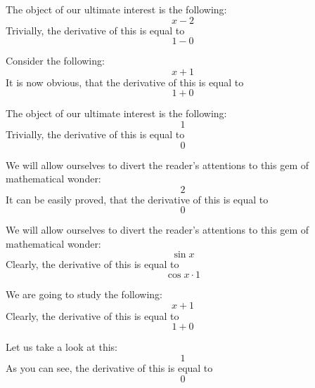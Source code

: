 \documentclass{article}
\begin{document}
The object of our ultimate interest is the following:
\begin{equation}
x - 2 
\end{equation}
Trivially, the derivative of this is equal to
\begin{equation}
1 - 0 
\end{equation}

Consider the following:
\begin{equation}
x + 1 
\end{equation}
It is now obvious, that the derivative of this is equal to
\begin{equation}
1 + 0 
\end{equation}

The object of our ultimate interest is the following:
\begin{equation}
1 
\end{equation}
Trivially, the derivative of this is equal to
\begin{equation}
0 
\end{equation}

We will allow ourselves to divert the reader's attentions to this gem of mathematical wonder:
\begin{equation}
2 
\end{equation}
It can be easily proved, that the derivative of this is equal to
\begin{equation}
0 
\end{equation}

We will allow ourselves to divert the reader's attentions to this gem of mathematical wonder:
\begin{equation}
\sin x 
\end{equation}
Clearly, the derivative of this is equal to
\begin{equation}
\cos x \cdot 1 
\end{equation}

We are going to study the following:
\begin{equation}
x + 1 
\end{equation}
Clearly, the derivative of this is equal to
\begin{equation}
1 + 0 
\end{equation}

Let us take a look at this:
\begin{equation}
1 
\end{equation}
As you can see, the derivative of this is equal to
\begin{equation}
0 
\end{equation}
\end{document}
